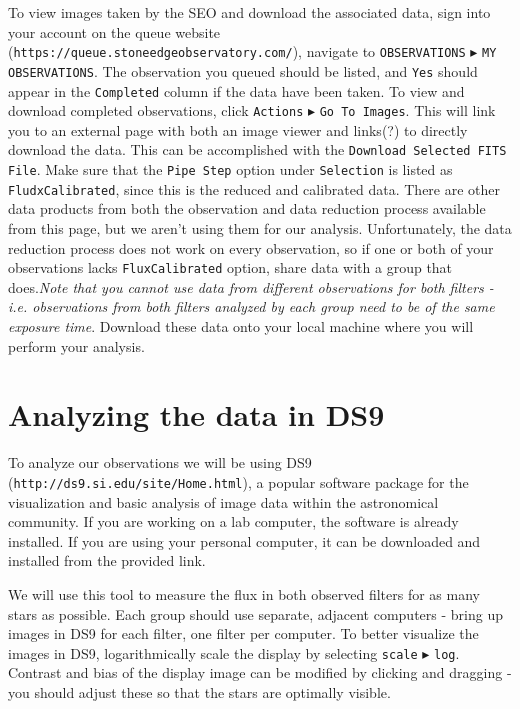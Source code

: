 To view images taken by the SEO and download the associated data, sign into your account on the queue website (\texttt{https://queue.stoneedgeobservatory.com/}), navigate to \texttt{OBSERVATIONS} $\blacktriangleright$ \texttt{MY OBSERVATIONS}. The observation you queued should be listed, and \texttt{Yes} should appear in the \texttt{Completed} column if the data have been taken. To view and download completed observations, click \texttt{Actions} $\blacktriangleright$ \texttt{Go To Images}. This will link you to an external page with both an image viewer and links(?) to directly download the data. This can be accomplished with the \texttt{Download Selected FITS File}. Make sure that the \texttt{Pipe Step} option under \texttt{Selection} is listed as \texttt{FludxCalibrated}, since this is the reduced and calibrated data. There are other data products from both the observation and data reduction process available from this page, but we aren't using them for our analysis. Unfortunately, the data reduction process does not work on every observation, so if one or both of your observations lacks \texttt{FluxCalibrated} option, share data with a group that does.\textit{Note that you cannot use data from different observations for both filters - i.e. observations from both filters analyzed by each group need to be of the same exposure time}. Download these data onto your local machine where you will perform your analysis.

\section{Analyzing the data in DS9}

To analyze our observations we will be using DS9 (\texttt{http://ds9.si.edu/site/Home.html}), a popular software package for the visualization and basic analysis of image data within the astronomical community. If you are working on a lab computer, the software is already installed. If you are using your personal computer, it can be downloaded and installed from the provided link. 

We will use this tool to measure the flux in both observed filters for as many stars as possible. Each group should use separate, adjacent computers - bring up images in DS9 for each filter, one filter per computer. To better visualize the images in DS9, logarithmically scale the display by selecting \texttt{scale} $\blacktriangleright$ \texttt{log}. Contrast and bias of the display image can be modified by clicking and dragging - you should adjust these so that the stars are optimally visible.

